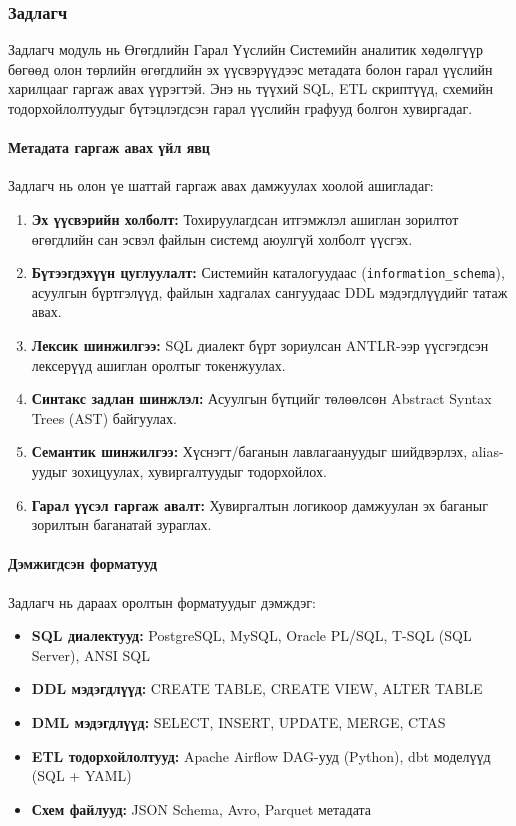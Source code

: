 \subsubsection{Задлагч}

Задлагч модуль нь Өгөгдлийн Гарал Үүслийн Системийн аналитик хөдөлгүүр бөгөөд олон төрлийн өгөгдлийн эх үүсвэрүүдээс метадата болон гарал үүслийн харилцааг гаргаж авах үүрэгтэй. Энэ нь түүхий SQL, ETL скриптүүд, схемийн тодорхойлолтуудыг бүтэцлэгдсэн гарал үүслийн графууд болгон хувиргадаг.

\paragraph{Метадата гаргаж авах үйл явц}
Задлагч нь олон үе шаттай гаргаж авах дамжуулах хоолой ашигладаг:

\begin{enumerate}
    \item \textbf{Эх үүсвэрийн холболт:} Тохируулагдсан итгэмжлэл ашиглан зорилтот өгөгдлийн сан эсвэл файлын системд аюулгүй холболт үүсгэх.
    
    \item \textbf{Бүтээгдэхүүн цуглуулалт:} Системийн каталогуудаас (\texttt{information\_schema}), асуулгын бүртгэлүүд, файлын хадгалах сангуудаас DDL мэдэгдлүүдийг татаж авах.
    
    \item \textbf{Лексик шинжилгээ:} SQL диалект бүрт зориулсан ANTLR-ээр үүсгэгдсэн лексерүүд ашиглан оролтыг токенжуулах.
    
    \item \textbf{Синтакс задлан шинжлэл:} Асуулгын бүтцийг төлөөлсөн Abstract Syntax Trees (AST) байгуулах.
    
    \item \textbf{Семантик шинжилгээ:} Хүснэгт/баганын лавлагаануудыг шийдвэрлэх, alias-уудыг зохицуулах, хувиргалтуудыг тодорхойлох.
    
    \item \textbf{Гарал үүсэл гаргаж авалт:} Хувиргалтын логикоор дамжуулан эх баганыг зорилтын баганатай зураглах.
\end{enumerate}

\paragraph{Дэмжигдсэн форматууд}
Задлагч нь дараах оролтын форматуудыг дэмждэг:

\begin{itemize}
    \item \textbf{SQL диалектууд:} PostgreSQL, MySQL, Oracle PL/SQL, T-SQL (SQL Server), ANSI SQL
    \item \textbf{DDL мэдэгдлүүд:} CREATE TABLE, CREATE VIEW, ALTER TABLE
    \item \textbf{DML мэдэгдлүүд:} SELECT, INSERT, UPDATE, MERGE, CTAS
    \item \textbf{ETL тодорхойлолтууд:} Apache Airflow DAG-ууд (Python), dbt моделүүд (SQL + YAML)
    \item \textbf{Схем файлууд:} JSON Schema, Avro, Parquet метадата
\end{itemize}

